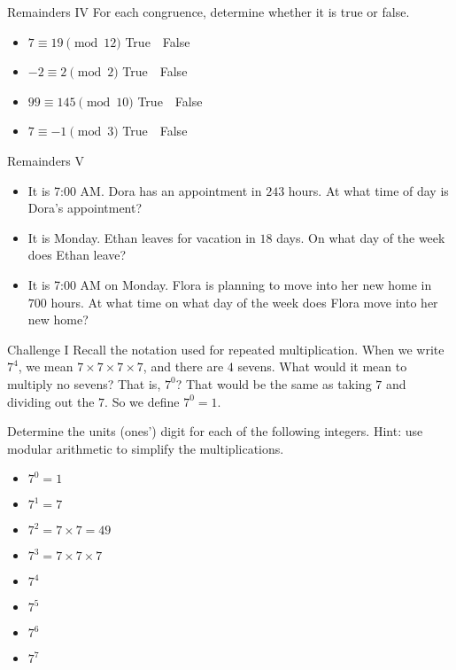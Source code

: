 \documentclass[12pt,letterpaper]{article}
\begin{document}
\begin{problem}{Remainders IV}
 For each congruence, determine whether it is true or false.

 \begin{itemize}
   \item $7 \equiv 19 \pmod {12}$ \hfill True~~False
   \item $-2 \equiv 2 \pmod {2}$ \hfill True~~False
   \item $99 \equiv 145 \pmod {10}$ \hfill True~~False
   \item $7 \equiv -1 \pmod {3}$ \hfill True~~False
 \end{itemize}
\end{problem}

\begin{problem}{Remainders V}

 \begin{itemize}
  \item It is 7:00 AM. Dora has an appointment in $243$ hours. At what time of
  day is Dora's appointment?
  \item It is Monday. Ethan leaves for vacation in $18$ days. On what day of the
  week does Ethan leave?
  \item It is 7:00 AM on Monday. Flora is planning to move into her new home in
  $700$ hours. At what time on what day of the week does Flora move into her new
  home?
 \end{itemize}
\end{problem}

\begin{problem}{Challenge I}
 Recall the notation used for repeated multiplication. When we write $7^4$, we
 mean $7 \times 7 \times 7 \times 7$, and there are $4$ sevens. What would it
 mean to multiply no sevens? That is, $7^0$? That would be the same as taking
 $7$ and dividing out the $7$. So we define $7^0=1$.

 Determine the units (ones') digit for each of the following integers. Hint:
 use modular arithmetic to simplify the multiplications.

 \begin{itemize}
  \item $7^0 = 1$ \hfill \blankC
  \item $7^1 = 7$ \hfill \blankC
  \item $7^2 = 7 \times 7 = 49$ \hfill \blankC
  \item $7^3 = 7 \times 7 \times 7$ \hfill \blankC
  \item $7^4$ \hfill \blankC
  \item $7^5$ \hfill \blankC
  \item $7^6$ \hfill \blankC
  \item $7^7$ \hfill \blankC
 \end{itemize}
\end{problem}
\end{document}
